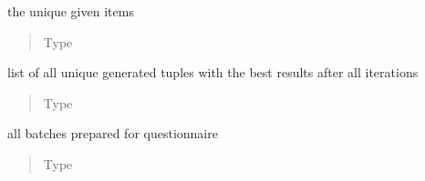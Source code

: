 \documentclass[a4paper,12pt,english]{sphinxmanual}
\begin{document}
\begin{fulllineitems}
\begin{fulllineitems}
\label{\detokenize{project_rst/generator:project.generator.DataGenerator.items}}
the unique given items
\begin{quote}\begin{description}
\item[{Type}] \leavevmode
{}

\end{description}\end{quote}

\end{fulllineitems}


\begin{fulllineitems}
\label{\detokenize{project_rst/generator:project.generator.DataGenerator.tuples}}
list of all unique generated tuples with the best
results after all iterations
\begin{quote}\begin{description}
\item[{Type}] \leavevmode
{}

\end{description}\end{quote}

\end{fulllineitems}


\begin{fulllineitems}
\label{\detokenize{project_rst/generator:project.generator.DataGenerator.batches}}
all batches prepared for questionnaire
\begin{quote}\begin{description}
\item[{Type}] \leavevmode
{}

\end{description}\end{quote}


\end{fulllineitems}
\end{fulllineitems}
\end{document}
